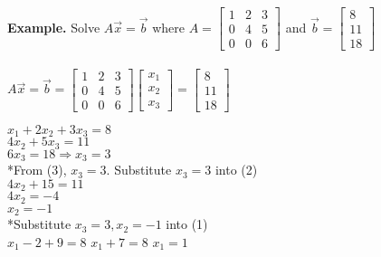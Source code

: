 \documentclass [12pt]{article}
\begin{document}
\noindent\textbf{Example. }Solve $A\overrightarrow{x}=\overrightarrow{b}$ where $A=\begin{bmatrix}
1&2&3\\
0&4&5\\
0&0&6
\end{bmatrix}$ and $\overrightarrow{b}=\begin{bmatrix}
8\\
11\\
18
\end{bmatrix}$\\\\
$A\overrightarrow{x}=\overrightarrow{b}=\begin{bmatrix}
1&2&3\\
0&4&5\\
0&0&6
\end{bmatrix}\begin{bmatrix}
x_1\\
x_2\\
x_3
\end{bmatrix}=\begin{bmatrix}
8\\
11\\
18
\end{bmatrix}$\\
\pagebreak

\noindent$x_1+2x_2+3x_3=8$\\
$4x_2+5x_3=11$\\
$6x_3=18\Rightarrow x_3=3$\\
*From (3), $x_3=3$. Substitute $x_3=3$ into (2)\\
$4x_2+15=11$\\
$4x_2=-4$\\
$x_2=-1$\\
*Substitute $x_3=3, x_2=-1$ into (1)\\
$x_1-2+9=8$
$x_1+7=8$
$x_1=1$\\\\
\end{document}
